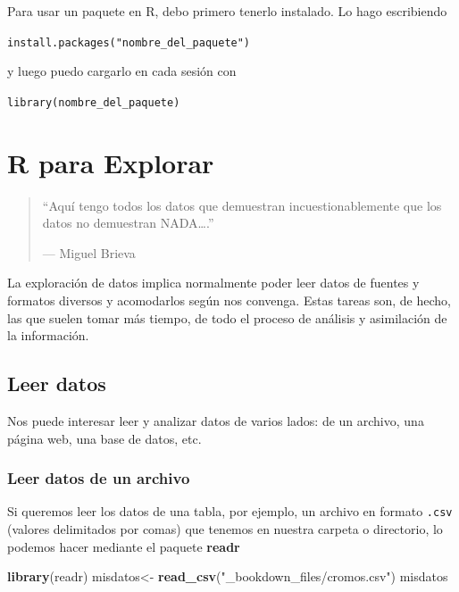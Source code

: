 \documentclass[]{book}
\newenvironment{Shaded}{\begin{snugshade}}{\end{snugshade}}
\newcommand{\KeywordTok}[1]{\textcolor[rgb]{0.13,0.29,0.53}{\textbf{{#1}}}}
\newcommand{\StringTok}[1]{\textcolor[rgb]{0.31,0.60,0.02}{{#1}}}
\newcommand{\NormalTok}[1]{{#1}}
\theoremstyle{definition}
\theoremstyle{definition}
\theoremstyle{remark}
\begin{document}
Para usar un paquete en R, debo primero tenerlo instalado. Lo hago
escribiendo

\texttt{install.packages("nombre\_del\_paquete")}

y luego puedo cargarlo en cada sesión con

\texttt{library(nombre\_del\_paquete)}

\chapter{R para Explorar}\label{r-para-explorar}

\begin{quote}
``Aquí tengo todos los datos que demuestran incuestionablemente que los
datos no demuestran NADA\ldots{}.''

--- Miguel Brieva
\end{quote}

La exploración de datos implica normalmente poder leer datos de fuentes
y formatos diversos y acomodarlos según nos convenga. Estas tareas son,
de hecho, las que suelen tomar más tiempo, de todo el proceso de
análisis y asimilación de la información.

\section{Leer datos}\label{leer-datos}

Nos puede interesar leer y analizar datos de varios lados: de un
archivo, una página web, una base de datos, etc.

\subsection{Leer datos de un archivo}\label{leer-datos-de-un-archivo}

Si queremos leer los datos de una tabla, por ejemplo, un archivo en
formato \texttt{.csv} (valores delimitados por comas) que tenemos en
nuestra carpeta o directorio, lo podemos hacer mediante el paquete
\textbf{readr} \citep{R-readr}

\begin{Shaded}
\begin{Highlighting}[]
\KeywordTok{library}\NormalTok{(readr)}
\NormalTok{misdatos<-}\StringTok{ }\KeywordTok{read_csv}\NormalTok{(}\StringTok{"_bookdown_files/cromos.csv"}\NormalTok{)}
\NormalTok{misdatos}
\end{Highlighting}
\end{Shaded}
\end{document}
